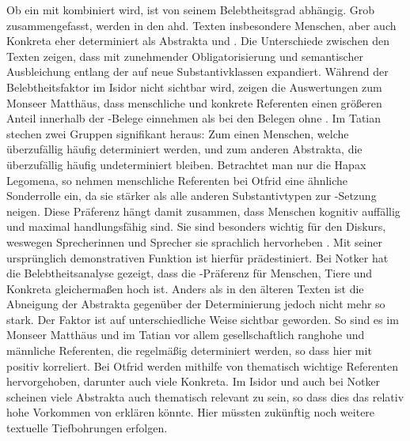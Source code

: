 Ob ein  mit  kombiniert wird, ist von seinem Belebtheitsgrad  abhängig. Grob zusammengefasst, werden in den ahd. Texten insbesondere Menschen, aber auch Konkreta  eher determiniert als Abstrakta  und . Die Unterschiede zwischen den Texten zeigen, dass  mit zunehmender Obligatorisierung und semantischer Ausbleichung entlang der  auf neue Substantivklassen expandiert. Während der Belebtheitsfaktor  im Isidor nicht sichtbar wird, zeigen die Auswertungen zum Monseer Matthäus, dass menschliche und konkrete  Referenten einen größeren Anteil innerhalb der -Belege einnehmen als bei den Belegen ohne . Im Tatian stechen zwei Gruppen signifikant heraus: Zum einen Menschen, welche überzufällig häufig determiniert werden, und zum anderen  Abstrakta, die überzufällig häufig undeterminiert bleiben. Betrachtet man nur die Hapax Legomena, so nehmen menschliche Referenten bei Otfrid eine ähnliche Sonderrolle ein, da sie stärker als alle anderen Substantivtypen zur -Setzung neigen. Diese Präferenz hängt damit zusammen, dass Menschen kognitiv auffällig und maximal handlungsfähig  sind. Sie sind besonders wichtig für den Diskurs, weswegen Sprecherinnen und Sprecher sie sprachlich hervorheben . Mit seiner ursprünglich demonstrativen Funktion ist  hierfür prädestiniert.  
Bei Notker hat die Belebtheitsanalyse  gezeigt, dass die  -Präferenz für Menschen, Tiere und Konkreta  gleichermaßen hoch ist. Anders als in den älteren Texten ist die Abneigung der  Abstrakta gegenüber der Determinierung jedoch nicht mehr so stark. Der Faktor  ist auf unterschiedliche Weise sichtbar geworden. So sind es im Monseer Matthäus und im Tatian vor allem gesellschaftlich ranghohe und männliche Referenten, die regelmäßig determiniert werden, so dass hier  mit  positiv korreliert. Bei Otfrid werden mithilfe von  thematisch wichtige Referenten hervorgehoben, darunter auch viele  Konkreta. Im Isidor und auch bei Notker scheinen viele Abstrakta  auch thematisch relevant zu sein, so dass dies das relativ hohe Vorkommen von  erklären könnte. Hier müssten zukünftig noch weitere textuelle Tiefbohrungen erfolgen.

